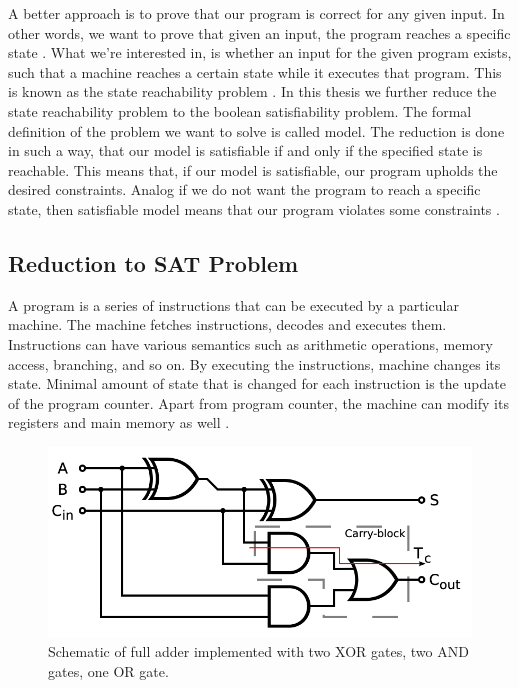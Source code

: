 \documentclass[12pt]{article}
\begin{document}
A better approach is to prove that our program is correct for any given input.
In other words, we want to prove that given an input, the program reaches a
specific state \cite{dunlop1982comparative}. What we're interested in, is
whether an input for the given program exists, such that a machine reaches a
certain state while it executes that program. This is known as the state
reachability problem \cite{abdulla2000symbolic}. In this thesis we further
reduce the state reachability problem to the boolean satisfiability problem.
The formal definition of the problem we want to solve is called model. The
reduction is done in such a way, that our model is satisfiable if and only if
the specified state is reachable. This means that, if our model is satisfiable,
our program upholds the desired constraints. Analog if we do not want the
program to reach a specific state, then satisfiable model means that our
program violates some constraints \cite{brummayer2008btor}.

\subsection{Reduction to SAT Problem}

A program is a series of instructions that can be executed by a particular
machine. The machine fetches instructions, decodes  and executes them.
Instructions can have various semantics such as arithmetic operations, memory
access, branching, and so on. By executing the instructions, machine changes
its state. Minimal amount of state that is changed for each instruction is the
update of the program counter. Apart from program counter, the machine can
modify its registers and main memory as well \cite{flynn2007computer}.


\begin{figure}
    \includegraphics[width=\linewidth]{assets/full_adder_schematic.png}
    \centering
    \caption{
        Schematic of full adder implemented with two XOR gates, two AND gates,
        one OR gate.
    }
    \label{fig:full_adder_schematic}
\end{figure}
\end{document}
